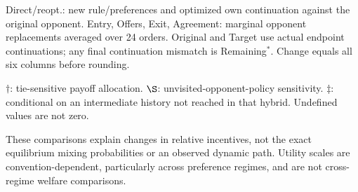 \documentclass[10pt]{article}
\begin{document}
{Direct/reopt.: new rule/preferences and optimized own continuation against the original opponent. Entry, Offers, Exit, Agreement: marginal opponent replacements averaged over 24 orders. Original and Target use actual endpoint continuations; any final continuation mismatch is Remaining$^*$. Change equals all six columns before rounding.\par
$\dagger$: tie-sensitive payoff allocation. $\S$: unvisited-opponent-policy sensitivity. $\ddagger$: conditional on an intermediate history not reached in that hybrid. Undefined values are not zero.\par
These comparisons explain changes in relative incentives, not the exact equilibrium mixing probabilities or an observed dynamic path. Utility scales are convention-dependent, particularly across preference regimes, and are not cross-regime welfare comparisons.}\par
\end{document}
